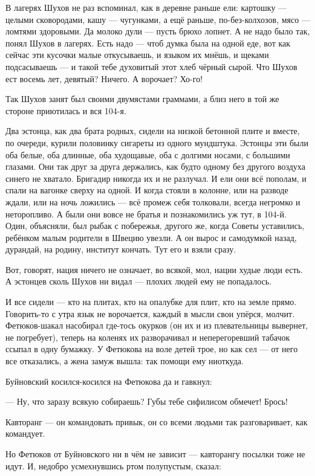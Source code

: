 В лагерях Шухов не раз вспоминал, как в деревне раньше ели: картошку --- целыми сковородами, 
кашу --- чугунками, а ещё раньше, по-без-колхозов, мясо --- ломтями здоровыми. Да молоко дули --- 
пусть брюхо лопнет. А не надо было так, понял Шухов в лагерях. Есть надо --- чтоб думка была на 
одной еде, вот как сейчас эти кусочки малые откусываешь, и языком их мнёшь, и щеками 
подсасываешь --- и такой тебе духовитый этот хлеб чёрный сырой. Что Шухов ест восемь лет, 
девятый? Ничего. А ворочает? Хо-го!

Так Шухов занят был своими двумястами граммами, а близ него в той же стороне приютилась и вся 
104-я.

Два эстонца, как два брата родных, сидели на низкой бетонной плите и вместе, по очереди, 
курили половинку сигареты из одного мундштука. Эстонцы эти были оба белые, оба длинные, оба 
худощавые, оба с долгими носами, с большими глазами. Они так друг за друга держались, как 
будто одному без другого воздуха синего не хватало. Бригадир никогда их и не разлучал. И ели 
они всё пополам, и спали на вагонке сверху на одной. И когда стояли в колонне, или на разводе 
ждали, или на ночь ложились --- всё промеж себя толковали, всегда негромко и неторопливо. А 
были они вовсе не братья и познакомились уж тут, в 104-й. Один, объясняли, был рыбак с побережья, 
другого же, когда Советы уставились, ребёнком малым родители в Швецию увезли. А он вырос и 
самодумкой назад, дурандай, на родину, институт кончать. Тут его и взяли сразу.

Вот, говорят, нация ничего не означает, во всякой, мол, нации худые люди есть. А эстонцев сколь 
Шухов ни видал --- плохих людей ему не попадалось.

И все сидели --- кто на плитах, кто на опалубке для плит, кто на земле прямо. Говорить-то с утра 
язык не ворочается, каждый в мысли свои упёрся, молчит. Фетюков-шакал насобирал где-тось 
окурков (он их и из плевательницы вывернет, не погребует), теперь на коленях их разворачивал 
и неперегоревший табачок ссыпал в одну бумажку. У Фетюкова на воле детей трое, но как сел --- 
от него все отказались, а жена замуж вышла: так помощи ему ниоткуда.

Буйновский косился-косился на Фетюкова да и гавкнул:

--- Ну, что заразу всякую собираешь? Губы тебе сифилисом обмечет! Брось!

Кавторанг --- он командовать привык, он со всеми людьми так разговаривает, как командует.

Но Фетюков от Буйновского ни в чём не зависит --- кавторангу посылки тоже не идут. И, недобро 
усмехнувшись ртом полупустым, сказал:

